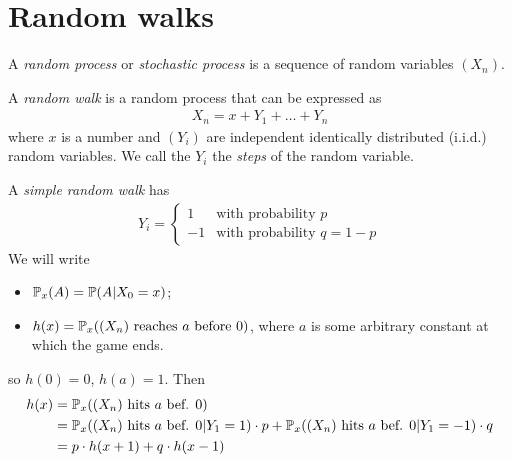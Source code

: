 \documentclass{../template/note}
\begin{document}
    \section{Random walks}

    \begin{definition}
        A \emph{random process} or \emph{stochastic process} is a sequence of random variables \((X_n)\).
    \end{definition}
    
    \begin{definition}
        A \emph{random walk} is a random process that can be expressed as
        \begin{align*}
            X_n = x + Y_1 + \dots + Y_n
        \end{align*}
        where \(x\) is a number and \((Y_i)\) are independent identically distributed (i.i.d.) random variables. We call the \(Y_i\) the \emph{steps} of the random variable.         
    \end{definition}
    
    A \emph{simple random walk} has
    \begin{align*}
        Y_i = \begin{cases}
            1 & \text{with probability }p \\
            -1 & \text{with probability }q = 1-p
        \end{cases}
    \end{align*}
    We will write
    \begin{itemize}
        \item \(\mathbb P_x(A) = \mathbb P(A | X_0 = x)\);
        \item \(h(x) = \mathbb P_x((X_n) \text{ reaches } a \text{ before }0)\), where \(a\) is some arbitrary constant at which the game ends.
    \end{itemize}
    so \(h(0) = 0\), \(h(a) = 1\). Then
    \begin{align*}
        h(x) &= \mathbb P_x((X_n) \text{ hits } a \text{ bef. }0) \\
        &= \mathbb P_x((X_n) \text{ hits } a \text{ bef. }0 | Y_1 = 1) \cdot p + \mathbb P_x((X_n) \text{ hits } a \text{ bef. }0 | Y_1 = -1) \cdot q \\
        &= p \cdot h(x+1) + q \cdot h(x-1)
    \end{align*}

    
\end{document}
